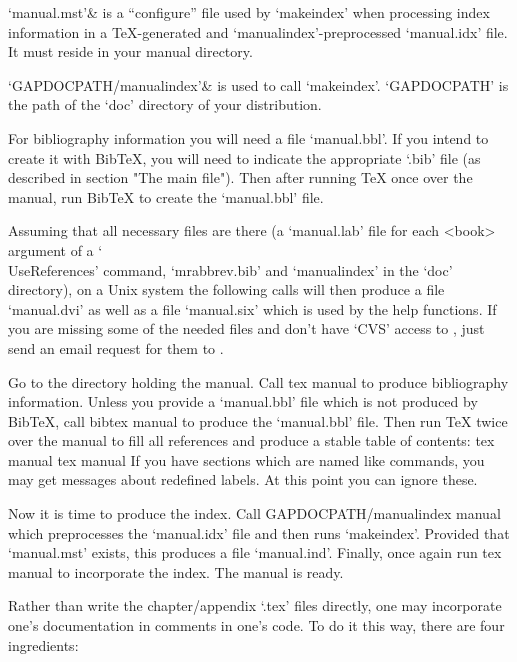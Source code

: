 `manual.mst'&
    is a ``configure'' file used by `makeindex' when processing
    index information in a {\TeX}-generated and `manualindex'-preprocessed
    `manual.idx' file.
    It must reside in your manual directory.

`GAPDOCPATH/manualindex'&
    is used to call `makeindex'.
    `GAPDOCPATH' is the path of the `doc' directory of your {\GAP}
    distribution.
\enditems

For bibliography information you will need a file `manual.bbl'. If you
intend to create it with Bib{\TeX}, you will need to indicate the
appropriate `.bib' file (as described in section "The main file"). Then
after running {\TeX} once over the manual, run Bib{\TeX} to create the
`manual.bbl' file.

Assuming that all necessary files are there (a `manual.lab' file for each
<book> argument of a `\\UseReferences' command, `mrabbrev.bib' and
`manualindex' in the {\GAP} `doc' directory),
on a Unix system the following calls will then produce a file `manual.dvi'
as well as a file `manual.six' which is used by the {\GAP} help functions.
If you are missing some of the needed files and don't have `CVS' access to
{\GAP}, just send an email request for them to 
.

Go to the directory holding the manual. Call
\begintt
tex manual
\endtt
to produce bibliography information. Unless you provide a `manual.bbl' file
which is not produced by Bib{\TeX}, call
\begintt
bibtex manual
\endtt
to produce the `manual.bbl' file. Then run {\TeX} twice over the manual to
fill all references and produce a stable table of contents:
\begintt
tex manual
tex manual
\endtt
If you have sections which are named like commands, you may get messages
about redefined labels. At this point you can ignore these.

Now it is time to produce the index. Call
\begintt
GAPDOCPATH/manualindex manual
\endtt
which preprocesses the `manual.idx' file and then
runs `makeindex'. Provided that `manual.mst' exists, this produces a file
`manual.ind'. Finally, once again run
\begintt
tex manual
\endtt
to incorporate the index. The manual is ready.


\indextt{\\Declaration}\indextt{\\FileHeader}
Rather than write the chapter/appendix `.tex'  files  directly,  one  may
incorporate one's documentation in comments in one's {\GAP} code.  To  do
it this way, there are four ingredients:

